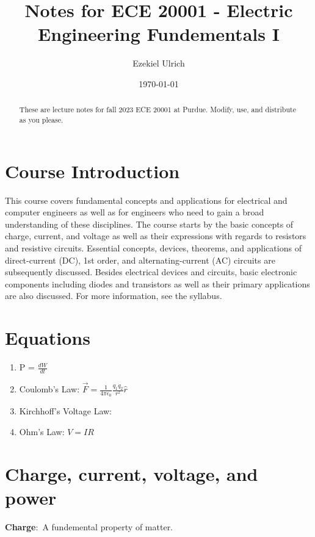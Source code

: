 \documentclass[nobib]{tufte-handout}
\title{Notes for ECE 20001 - Electric Engineering Fundementals I}
\author[Ezekiel Ulrich]{Ezekiel Ulrich}
\date{\today}  %
\newcommand{\defn}[2]{\noindent\textbf{#1}:\ #2}
\begin{document}
\maketitle

\begin{abstract}
These are lecture notes for fall 2023 ECE 20001 at Purdue. Modify, use, and distribute as you please.
\end{abstract}

\tableofcontents

\section{Course Introduction}

This course covers fundamental concepts and applications 
for electrical and computer engineers as well as for engineers
 who need to gain a broad understanding of these disciplines. 
 The course starts by the basic concepts of charge, current, 
 and voltage as well as their expressions with regards to 
 resistors and resistive circuits. Essential concepts, 
 devices, theorems, and applications of direct-current (DC), 
 1st order, and alternating-current (AC) circuits are 
 subsequently discussed. Besides electrical devices and 
 circuits, basic electronic components including diodes and 
 transistors as well as their primary applications are also 
 discussed. For more information, see the syllabus. 

\section{Equations}

\begin{enumerate}
    \item P = $\frac{dW}{dt}$
    \item Coulomb's Law: $\vec{F} = \frac{1}{4\pi \epsilon_0}\frac{q_1 q_2}{r^2}\hat{r}$
    \item Kirchhoff's Voltage Law: 
    \item Ohm's Law: $V=IR$

\end{enumerate}

\section{Charge, current, voltage, and power}

\defn{Charge}{A fundemental property of matter.}
\end{document}
